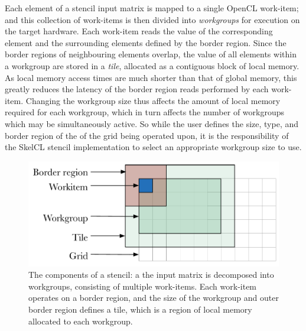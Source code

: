 \documentclass[nonatbib,preprint,10pt]{sigplanconf}
\begin{document}
%
Each element of a stencil input matrix is mapped to a single OpenCL
work-item; and this collection of work-items is then divided into
\emph{workgroups} for execution on the target hardware. Each work-item
reads the value of the corresponding element and the surrounding
elements defined by the border region. Since the border regions of
neighbouring elements overlap, the value of all elements within a
workgroup are stored in a \emph{tile}, allocated as a contiguous block
of local memory. As local memory access times are much shorter than
that of global memory, this greatly reduces the latency of the border
region reads performed by each work-item. Changing the workgroup size
thus affects the amount of local memory required for each workgroup,
which in turn affects the number of workgroups which may be
simultaneously active. So while the user defines the size, type, and
border region of the of the grid being operated upon, it is the
responsibility of the SkelCL stencil implementation to select an
appropriate workgroup size to use.

\begin{figure}
\centering
\includegraphics[width=.75\columnwidth]{img/stencil-wg}
\caption[Workgroup decomposition in stencils]{%
  The components of a stencil: a the input matrix is decomposed into
  workgroups, consisting of multiple work-items. Each work-item
  operates on a border region, and the size of the workgroup and outer
  border region defines a tile, which is a region of local memory
  allocated to each workgroup.%
}
\label{fig:stencil-wg}
\end{figure}
\end{document}

